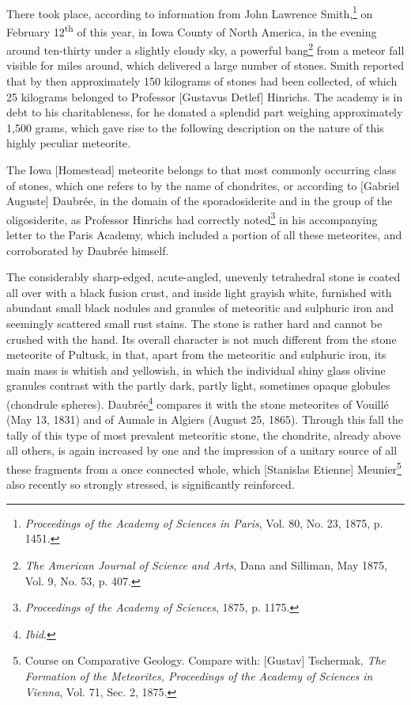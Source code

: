 \documentclass[a4paper, 12pt, oneside]{article}
\begin{document}
\paragraph*{}
There took place, according to information from John Lawrence Smith,\footnote{\emph{Proceedings of the Academy of Sciences in Paris}, Vol. 80, No. 23, 1875, p. 1451.} on February 12\textsuperscript{th} of this year, in Iowa County of North America, in the evening around ten-thirty under a slightly cloudy sky, a powerful bang\footnote{\emph{The American Journal of Science and Arts}, Dana and Silliman, May 1875, Vol. 9, No. 53, p. 407.} from a meteor fall visible for miles around, which delivered a large number of stones. Smith reported that by then approximately 150 kilograms of stones had been collected, of which 25 kilograms belonged to Professor [Gustavus Detlef] Hinrichs. The academy is in debt to his charitableness, for he donated a splendid part weighing approximately 1,500 grams, which gave rise to the following description on the nature of this highly peculiar meteorite.

The Iowa [Homestead] meteorite belongs to that most commonly occurring class of stones, which one refers to by the name of chondrites, or according to [Gabriel Auguste] Daubrée, in the domain of the sporadosiderite and in the group of the oligosiderite, as Professor Hinrichs had correctly noted\footnote{\emph{Proceedings of the Academy of Sciences}, 1875, p. 1175.} in his accompanying letter to the Paris Academy, which included a portion of all these meteorites, and corroborated by Daubrée himself.

The considerably sharp-edged, acute-angled, unevenly tetrahedral stone is coated all over with a black fusion crust, and inside light grayish white, furnished with abundant small black nodules and granules of meteoritic and sulphuric iron and seemingly scattered small rust stains. The stone is rather hard and cannot be crushed with the hand. Its overall character is not much different from the stone meteorite of Pultusk, in that, apart from the meteoritic and sulphuric iron, its main mass is whitish and yellowish, in which the individual shiny glass olivine granules contrast with the partly dark, partly light, sometimes opaque globules (chondrule spheres). Daubrée\footnote{\emph{Ibid}.} compares it with the stone meteorites of Vouillé (May 13, 1831) and of Aumale in Algiers (August 25, 1865). Through this fall the tally of this type of most prevalent meteoritic stone, the chondrite, already above all others, is again increased by one and the impression of a unitary source of all these fragments from a once connected whole, which [Stanislas Etienne] Meunier\footnote{Course on Comparative Geology. Compare with: [Gustav] Tschermak, \emph{The Formation of the Meteorites, Proceedings of the Academy of Sciences in Vienna}, Vol. 71, Sec. 2, 1875.} also recently so strongly stressed, is significantly reinforced.
\end{document}
